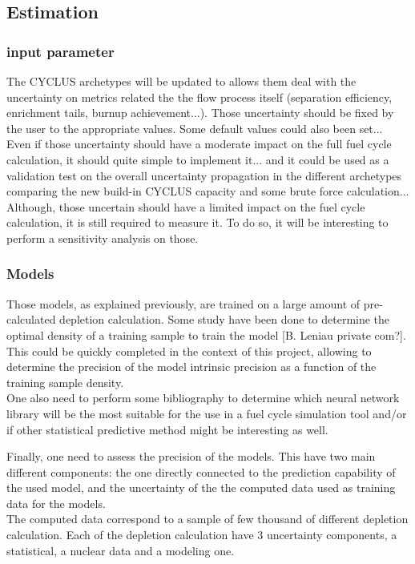 \documentclass[dvips,12pt]{article}
\begin{document}
\subsection{Estimation}
\subsubsection{input parameter}
The CYCLUS archetypes will be updated to allows them deal with the uncertainty on metrics related the the flow process itself (separation efficiency, enrichment tails, burnup achievement...). Those uncertainty should be fixed by the user to the appropriate values. Some default values could also been set...\\
Even if those uncertainty should have a moderate impact on the full fuel cycle calculation, it should quite simple to implement it... and it could be used as a validation test on the overall uncertainty propagation in the different archetypes comparing the new build-in CYCLUS capacity and some brute force calculation...\\
Although, those uncertain should have a limited impact on the fuel cycle calculation, it is still required to measure it. To do so, it will be interesting to perform a sensitivity analysis on those.




\subsubsection{Models}
Those models, as explained previously, are trained on a large amount of pre-calculated depletion calculation. Some study have been done to determine the optimal density of a training sample to train the model [B. Leniau private com?]. This could be quickly completed in the context of this project, allowing to determine the precision of the model intrinsic precision as a function of the training sample density.\\

One also need to perform some bibliography to determine which neural network library will be the most suitable for the use in a fuel cycle simulation tool and/or if other statistical predictive method might be interesting as well.

Finally, one need to assess the precision of the models. This have two main different components: the one directly connected to the prediction capability of the used model, and the uncertainty of the the computed data used as training data for the models.\\
The computed data correspond to a sample of few thousand of different depletion calculation. Each of the depletion calculation have 3 uncertainty components, a statistical, a nuclear data and a modeling one. 
\end{document}
